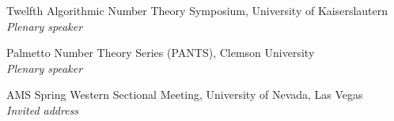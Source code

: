 \documentclass[12pt]{article}
\newenvironment{date_section}
	{
	\vspace{-1ex}
	\leftmargini = 15ex
	 \begin{itemize}[
		 labelsep = *,
		 labelwidth = 9ex,
		 labelindent = 0ex,
		 itemindent = !,
		 font=\normalfont, 
		 align=parleft
		 ]
		{}
		\itemsep=-1.5mm}
	{\end{itemize}\vspace{-2ex}}
\newcommand{\yearmo}[2]{
	\item[ 
		{\makebox[1ex][r]{#1}}
		\hspace{1ex}
		{\makebox[1ex][l]{#2} }
		] }
\begin{document}
\begin{date_section}
            \yearmo{}{2016}
			Twelfth Algorithmic Number Theory Symposium, University of Kaiserslautern\\
			\textit{Plenary speaker}
			
	
			\yearmo{}{2015}
			Palmetto Number Theory Series (PANTS), Clemson University
            \\
            			\textit{Plenary speaker}
			
            
			
			
            \yearmo{}{}
			AMS Spring Western Sectional Meeting, University of Nevada, Las Vegas\\
			\textit{Invited address}
            
            
    
	

\end{date_section}
\end{document}
